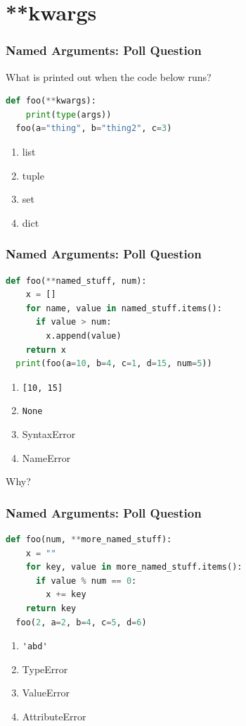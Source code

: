 \documentclass{beamer}
\begin{document}
\section{**kwargs}

%
%
\begin{frame}[fragile]
  \frametitle{Named Arguments: Poll Question}
  What is printed out when the code below runs?
  \begin{lstlisting}[language=Python, autogobble]
  def foo(**kwargs):
    print(type(args))
  foo(a="thing", b="thing2", c=3)
  \end{lstlisting}
  \vfill
  \begin{enumerate}[A]
    \item list
    \item tuple
    \item set
    \item dict
  \end{enumerate}
\end{frame}


%
%
\begin{frame}[fragile]
  \frametitle{Named Arguments: Poll Question}
  \begin{lstlisting}[language=Python, autogobble]
  def foo(**named_stuff, num):
    x = []
    for name, value in named_stuff.items():
      if value > num:
        x.append(value)
    return x
  print(foo(a=10, b=4, c=1, d=15, num=5))
  \end{lstlisting}
  \vfill
  \begin{enumerate}[A]
    \item \lstinline|[10, 15]|
    \item \lstinline|None|
    \item SyntaxError
    \item NameError
  \end{enumerate}
  \pause
  \vfill
  Why?
\end{frame}

%
%
\begin{frame}[fragile]
  \frametitle{Named Arguments: Poll Question}
  \begin{lstlisting}[language=Python, autogobble]
  def foo(num, **more_named_stuff):
    x = ""
    for key, value in more_named_stuff.items():
      if value % num == 0:
        x += key
    return key
  foo(2, a=2, b=4, c=5, d=6)
  \end{lstlisting}
  \vfill
  \begin{enumerate}[A]
    \item \lstinline|'abd'|
    \item TypeError
    \item ValueError
    \item AttributeError
  \end{enumerate}
\end{frame}
\end{document}
